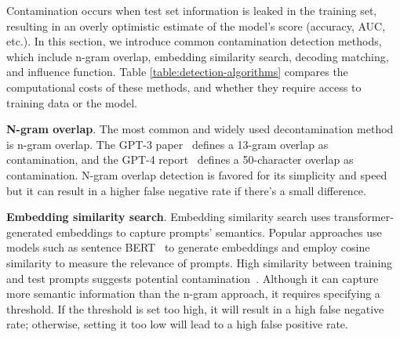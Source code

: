 Contamination occurs when test set information is leaked in the training set, resulting in an overly optimistic estimate of the model’s score (accuracy, AUC, etc.).
In this section, we introduce common contamination detection methods, which include n-gram overlap, embedding similarity search, decoding matching, and influence function.
Table \ref{table:detection-algorithms} compares the computational costs of these methods, and whether they require access to training data or the model.

\textbf{N-gram overlap}. The most common and widely used decontamination method is n-gram overlap. 
The GPT-3 paper~\citep{brown2020language} defines a 13-gram overlap as contamination, and the GPT-4 report~\citep{openai2023gpt4} defines a 50-character overlap as contamination. N-gram overlap detection is favored for its simplicity and speed but it can result in a higher false negative rate if there's a small difference. 

\textbf{Embedding similarity search}. Embedding similarity search uses transformer-generated embeddings to capture prompts' semantics. 
Popular approaches use models such as sentence BERT~\citep{reimers-2019-sentence-bert} to generate embeddings and employ cosine similarity to measure the relevance of prompts. High similarity between training and test prompts suggests potential contamination~\citep{lee2023platypus}.
Although it can capture more semantic information than the n-gram approach, it requires specifying a threshold. 
If the threshold is set too high, it will result in a high false negative rate; otherwise, setting it too low will lead to a high false positive rate.


